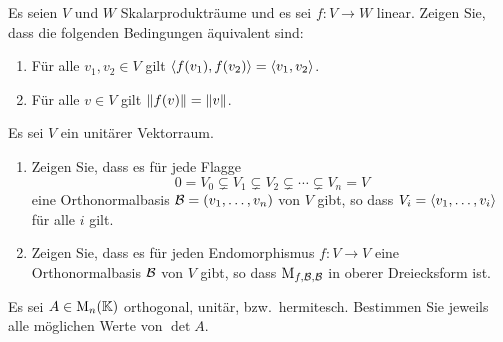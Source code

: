 \documentclass[a4paper, 10pt]{scrartcl}
\begin{document}
\begin{question}
  Es seien $V$ und $W$ Skalarprodukträume und es sei $f \colon V \to W$ linear.
  Zeigen Sie, dass die folgenden Bedingungen äquivalent sind:
  \begin{enumerate}
    \item
      Für alle $v_1, v_2 \in V$ gilt $\left\langle f(v_1), f(v_2) \right\rangle = \left\langle v_1, v_2 \right\rangle$.
    \item
      Für alle $v \in V$ gilt $\left\| f(v) \right\| = \left\| v \right\|$.
  \end{enumerate}
\end{question}





\begin{question}
  Es sei $V$ ein unitärer Vektorraum.
  \begin{enumerate}
    \item
      Zeigen Sie, dass es für jede Flagge
      \[
                    0
        =           V_0
        \subsetneq  V_1
        \subsetneq  V_2
        \subsetneq  \dotsb
        \subsetneq  V_n
        =           V
      \]
      eine Orthonormalbasis $\mathcal{B} = (v_1, \dotsc, v_n)$ von $V$ gibt, so dass $V_i = \left\langle v_1, \dotsc, v_i \right\rangle$ für alle $i$ gilt.
    \item
      Zeigen Sie, dass es für jeden Endomorphismus $f \colon V \to V$ eine Orthonormalbasis $\mathcal{B}$ von $V$ gibt, so dass $\operatorname{M}_{f, \mathcal{B}, \mathcal{B}}$ in oberer Dreiecksform ist.
  \end{enumerate}
\end{question}





\begin{question}
  Es sei $A \in \operatorname{M}_{n}(\mathbb{K})$ orthogonal, unitär, bzw.\ hermitesch.
  Bestimmen Sie jeweils alle möglichen Werte von $\det A$.
\end{question}





\end{document}
